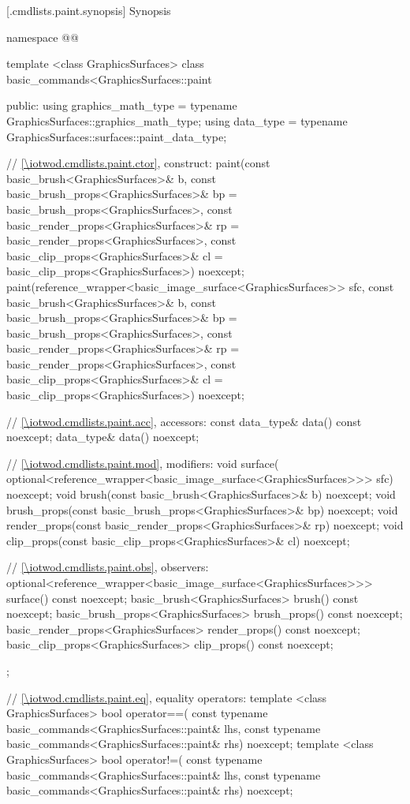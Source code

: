  [\iotwod.cmdlists.paint.synopsis] {Synopsis}
\begin{codeblock}
namespace @\fullnamespace{}@ {
  template <class GraphicsSurfaces>
  class basic_commands<GraphicsSurfaces::paint {
  public:
    using graphics_math_type = typename GraphicsSurfaces::graphics_math_type;
    using data_type = typename GraphicsSurfaces::surfaces::paint_data_type;

    // \ref{\iotwod.cmdlists.paint.ctor}, construct:
    paint(const basic_brush<GraphicsSurfaces>& b,
      const basic_brush_props<GraphicsSurfaces>& bp = 
      basic_brush_props<GraphicsSurfaces>{},
      const basic_render_props<GraphicsSurfaces>& rp = 
      basic_render_props<GraphicsSurfaces>{},
      const basic_clip_props<GraphicsSurfaces>& cl = 
      basic_clip_props<GraphicsSurfaces>{}) noexcept;
    paint(reference_wrapper<basic_image_surface<GraphicsSurfaces>> sfc,
      const basic_brush<GraphicsSurfaces>& b,
      const basic_brush_props<GraphicsSurfaces>& bp = 
      basic_brush_props<GraphicsSurfaces>{},
      const basic_render_props<GraphicsSurfaces>& rp = 
      basic_render_props<GraphicsSurfaces>{},
      const basic_clip_props<GraphicsSurfaces>& cl = 
      basic_clip_props<GraphicsSurfaces>{}) noexcept;

    // \ref{\iotwod.cmdlists.paint.acc}, accessors:
    const data_type& data() const noexcept;
    data_type& data() noexcept;

    // \ref{\iotwod.cmdlists.paint.mod}, modifiers:
    void surface(
      optional<reference_wrapper<basic_image_surface<GraphicsSurfaces>>> sfc) 
      noexcept;
    void brush(const basic_brush<GraphicsSurfaces>& b) noexcept;
    void brush_props(const basic_brush_props<GraphicsSurfaces>& bp) noexcept;
    void render_props(const basic_render_props<GraphicsSurfaces>& rp) noexcept;
    void clip_props(const basic_clip_props<GraphicsSurfaces>& cl) noexcept;

    // \ref{\iotwod.cmdlists.paint.obs}, observers:
    optional<reference_wrapper<basic_image_surface<GraphicsSurfaces>>> 
      surface() const noexcept;
    basic_brush<GraphicsSurfaces> brush() const noexcept;
    basic_brush_props<GraphicsSurfaces> brush_props() const noexcept;
    basic_render_props<GraphicsSurfaces> render_props() const noexcept;
    basic_clip_props<GraphicsSurfaces> clip_props() const noexcept;
  };

  // \ref{\iotwod.cmdlists.paint.eq}, equality operators:
  template <class GraphicsSurfaces>
  bool operator==(
    const typename basic_commands<GraphicsSurfaces::paint& lhs,
    const typename basic_commands<GraphicsSurfaces::paint& rhs) 
    noexcept;
  template <class GraphicsSurfaces>
  bool operator!=(
    const typename basic_commands<GraphicsSurfaces::paint& lhs,
    const typename basic_commands<GraphicsSurfaces::paint& rhs) 
    noexcept;
}
\end{codeblock}

